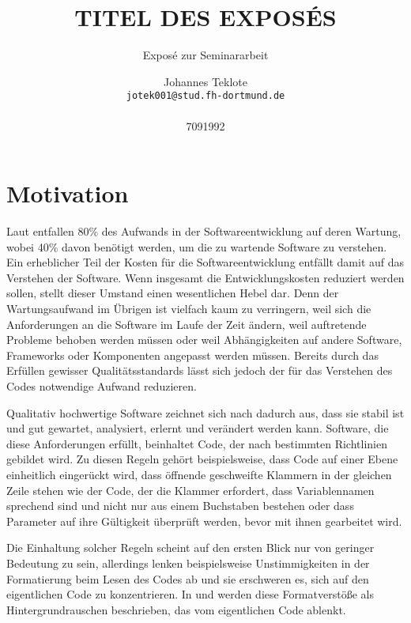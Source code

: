 \documentclass[fontsize=11pt, paper=a4, parskip=half]{scrartcl}
\title{
	TITEL DES EXPOSÉS
}
\subtitle{Exposé zur Seminararbeit}
\author{
	Johannes Teklote
	\\
	\texttt{jotek001@stud.fh-dortmund.de}
	\\ \\
	{7091992}
}
\begin{document}
\maketitle

\section{Motivation}
Laut \cite{Balzert2009} entfallen 80\% des Aufwands in der Softwareentwicklung auf deren Wartung, wobei 40\% davon benötigt werden, um die zu wartende Software zu verstehen.
Ein erheblicher Teil der Kosten für die Softwareentwicklung entfällt damit auf das Verstehen der Software.
Wenn insgesamt die Entwicklungskosten reduziert werden sollen, stellt dieser Umstand einen wesentlichen Hebel dar.
Denn der Wartungsaufwand im Übrigen ist vielfach kaum zu verringern, weil sich die Anforderungen an die Software im Laufe der Zeit ändern, weil auftretende Probleme behoben werden müssen oder weil Abhängigkeiten auf andere Software, Frameworks oder Komponenten angepasst werden müssen.
Bereits durch das Erfüllen gewisser Qualitätsstandards lässt sich jedoch der für das Verstehen des Codes notwendige Aufwand reduzieren.

Qualitativ hochwertige Software zeichnet sich nach \cite{ISO-25010} dadurch aus, dass sie stabil ist und gut gewartet, analysiert, erlernt und verändert werden kann.
Software, die diese Anforderungen erfüllt, beinhaltet Code, der nach bestimmten Richtlinien gebildet wird.
Zu diesen Regeln gehört beispielsweise, dass Code auf einer Ebene einheitlich eingerückt wird, dass öffnende geschweifte Klammern in der gleichen Zeile stehen wie der Code, der die Klammer erfordert, dass Variablennamen sprechend sind und nicht nur aus einem Buchstaben bestehen oder dass Parameter auf ihre Gültigkeit überprüft werden, bevor mit ihnen gearbeitet wird.

Die Einhaltung solcher Regeln scheint auf den ersten Blick nur von geringer Bedeutung zu sein, allerdings lenken beispielsweise Unstimmigkeiten in der Formatierung beim Lesen des Codes ab und sie erschweren es, sich auf den eigentlichen Code zu konzentrieren.
In \cite{PJ2015} und \cite{SP2011} werden diese Formatverstöße als Hintergrundrauschen beschrieben, das vom eigentlichen Code ablenkt. 
\end{document}
